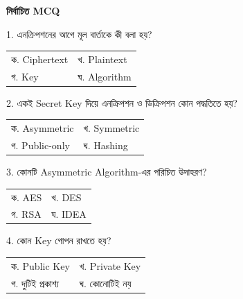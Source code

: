 \textbf{নির্বাচিত MCQ}
\begin{chSixSideBySide}[.48]
\small 1. এনক্রিপশনের আগে মূল বার্তাকে কী বলা হয়?

\par
\begin{tabularx}{\linewidth}{@{}Y Y@{}}
ক. Ciphertext & খ. Plaintext \\
গ. Key & ঘ. Algorithm \\
\end{tabularx}
\smallskip
{}
\chSixNextColumn
\small 2. একই Secret Key দিয়ে এনক্রিপশন ও ডিক্রিপশন কোন পদ্ধতিতে হয়?

\par
\begin{tabularx}{\linewidth}{@{}Y Y@{}}
ক. Asymmetric & খ. Symmetric \\
গ. Public-only & ঘ. Hashing \\
\end{tabularx}
\smallskip
{}
\end{chSixSideBySide}
\begin{chSixSideBySide}[.48]
\small 3. কোনটি Asymmetric Algorithm-এর পরিচিত উদাহরণ?

\par
\begin{tabularx}{\linewidth}{@{}Y Y@{}}
ক. AES & খ. DES \\
গ. RSA & ঘ. IDEA \\
\end{tabularx}
\smallskip
{}
\chSixNextColumn
\small 4. কোন Key গোপন রাখতে হয়?

\par
\begin{tabularx}{\linewidth}{@{}Y Y@{}}
ক. Public Key & খ. Private Key \\
গ. দুটিই প্রকাশ্য & ঘ. কোনোটিই নয় \\
\end{tabularx}
\smallskip
{}
\end{chSixSideBySide}
